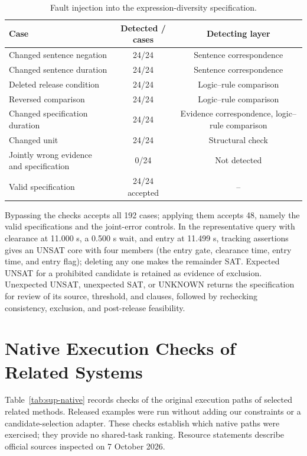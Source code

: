 \documentclass[10pt]{article}
\begin{document}
\begin{table}[h]
\centering\small
\caption{Fault injection into the expression-diversity specification.}
\label{tab:sup-diversity}
\begin{tabular}{lcc}
\toprule
Case & Detected / cases & Detecting layer\\
\midrule
Changed sentence negation & 24/24 & Sentence correspondence\\
Changed sentence duration & 24/24 & Sentence correspondence\\
Deleted release condition & 24/24 & Logic--rule comparison\\
Reversed comparison & 24/24 & Logic--rule comparison\\
Changed specification duration & 24/24 & Evidence correspondence, logic--rule comparison\\
Changed unit & 24/24 & Structural check\\
Jointly wrong evidence and specification & 0/24 & Not detected\\
Valid specification & 24/24 accepted & --\\
\bottomrule
\end{tabular}
\end{table}

Bypassing the checks accepts all 192 cases; applying them accepts 48, namely
the valid specifications and the joint-error controls. In the representative
query with clearance at 11.000 s, a 0.500 s wait, and entry at 11.499 s,
tracking assertions gives an UNSAT core with four members (the entry gate,
clearance time, entry time, and entry flag); deleting any one makes the
remainder SAT. Expected UNSAT for a prohibited candidate is retained as
evidence of exclusion. Unexpected UNSAT, unexpected SAT, or UNKNOWN returns the
specification for review of its source, threshold, and clauses, followed by
rechecking consistency, exclusion, and post-release feasibility.

\section{Native Execution Checks of Related Systems}\label{sup:native}

Table~\ref{tab:sup-native} records checks of the original execution paths of
selected related methods. Released examples were run without adding our
constraints or a candidate-selection adapter. These checks establish which
native paths were exercised; they provide no shared-task ranking. Resource
statements describe official sources inspected on 7 October 2026.
\end{document}
